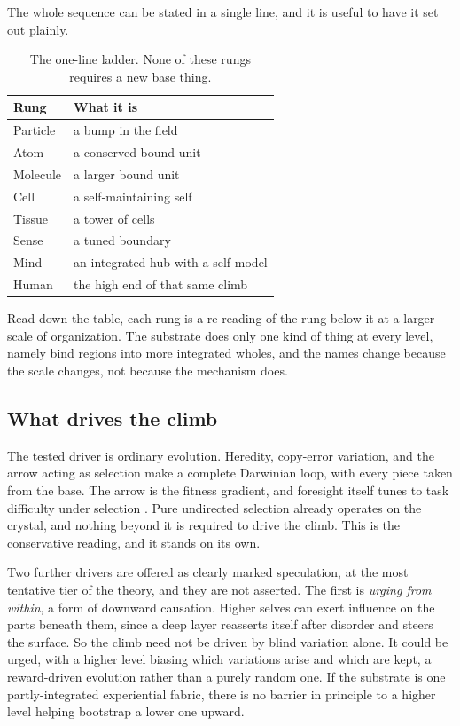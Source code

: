 The whole sequence can be stated in a single line, and it is useful to have it set out plainly.

\begin{table}[ht]
\centering
\begin{tabular}{ll}
\toprule
Rung & What it is \\
\midrule
Particle & a bump in the field \\
Atom & a conserved bound unit \\
Molecule & a larger bound unit \\
Cell & a self-maintaining self \\
Tissue & a tower of cells \\
Sense & a tuned boundary \\
Mind & an integrated hub with a self-model \\
Human & the high end of that same climb \\
\bottomrule
\end{tabular}
\caption{The one-line ladder. None of these rungs requires a new base thing.}
\end{table}

Read down the table, each rung is a re-reading of the rung below it at a larger scale of organization. The
substrate does only one kind of thing at every level, namely bind regions into more integrated wholes, and the
names change because the scale changes, not because the mechanism does.

\subsection{What drives the climb}

The tested driver is ordinary evolution. Heredity, copy-error variation, and the arrow acting as selection make a
complete Darwinian loop, with every piece taken from the base. The arrow is the fitness gradient, and foresight
itself tunes to task difficulty under selection \cite{pollard2026vibetest}. Pure undirected selection already
operates on the crystal, and nothing beyond it is required to drive the climb. This is the conservative reading,
and it stands on its own.

Two further drivers are offered as clearly marked speculation, at the most tentative tier of the theory, and they
are not asserted. The first is \emph{urging from within}, a form of downward causation. Higher selves can exert
influence on the parts beneath them, since a deep layer reasserts itself after disorder and steers the surface. So
the climb need not be driven by blind variation alone. It could be urged, with a higher level biasing which
variations arise and which are kept, a reward-driven evolution rather than a purely random one. If the substrate is
one partly-integrated experiential fabric, there is no barrier in principle to a higher level helping bootstrap a
lower one upward.

